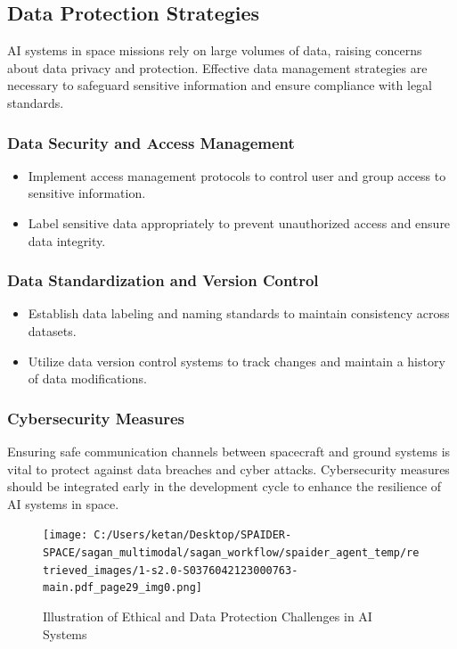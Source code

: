 \documentclass[a4paper, 11pt]{article}
\begin{document}
\subsection{Data Protection Strategies}

AI systems in space missions rely on large volumes of data, raising concerns about data privacy and protection. Effective data management strategies are necessary to safeguard sensitive information and ensure compliance with legal standards.

\subsubsection{Data Security and Access Management}

\begin{itemize}
    \item Implement access management protocols to control user and group access to sensitive information.
    \item Label sensitive data appropriately to prevent unauthorized access and ensure data integrity.
\end{itemize}

\subsubsection{Data Standardization and Version Control}

\begin{itemize}
    \item Establish data labeling and naming standards to maintain consistency across datasets.
    \item Utilize data version control systems to track changes and maintain a history of data modifications.
\end{itemize}

\subsubsection{Cybersecurity Measures}

Ensuring safe communication channels between spacecraft and ground systems is vital to protect against data breaches and cyber attacks. Cybersecurity measures should be integrated early in the development cycle to enhance the resilience of AI systems in space.

\begin{figure}[htbp]
    \centering
    \texttt{[image: C:/Users/ketan/Desktop/SPAIDER-SPACE/sagan\_multimodal/sagan\_workflow/spaider\_agent\_temp/retrieved\_images/1-s2.0-S0376042123000763-main.pdf\_page29\_img0.png]}
    \caption{Illustration of Ethical and Data Protection Challenges in AI Systems}
    \label{fig:ethical_data_protection}
\end{figure}
\end{document}
